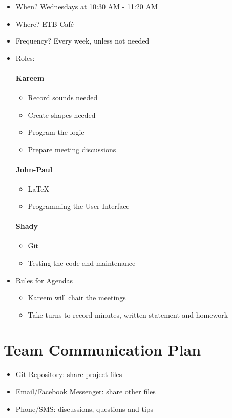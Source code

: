 \documentclass{article}
\begin{document}
\begin{itemize}
\item When? Wednesdays at 10:30 AM - 11:20 AM
\item Where? ETB Café
\item Frequency? Every week, unless not needed
\item Roles:

\paragraph{Kareem}
\begin{itemize}
\item Record sounds needed
\item Create shapes needed
\item Program the logic
\item Prepare meeting discussions
\end{itemize}

\paragraph{John-Paul}
\begin{itemize}
\item LaTeX
\item Programming the User Interface
\end{itemize}

\paragraph{Shady}
\begin{itemize}
\item Git
\item Testing the code and maintenance
\end{itemize}

\item Rules for Agendas
\begin{itemize}
\item Kareem will chair the meetings
\item Take turns to record minutes, written statement and homework
\end{itemize}
\end{itemize}

\section{Team Communication Plan}
\begin{itemize}
\item Git Repository: share project files
\item Email/Facebook Messenger: share other files
\item Phone/SMS: discussions, questions and tips
\end{itemize}
\end{document}
